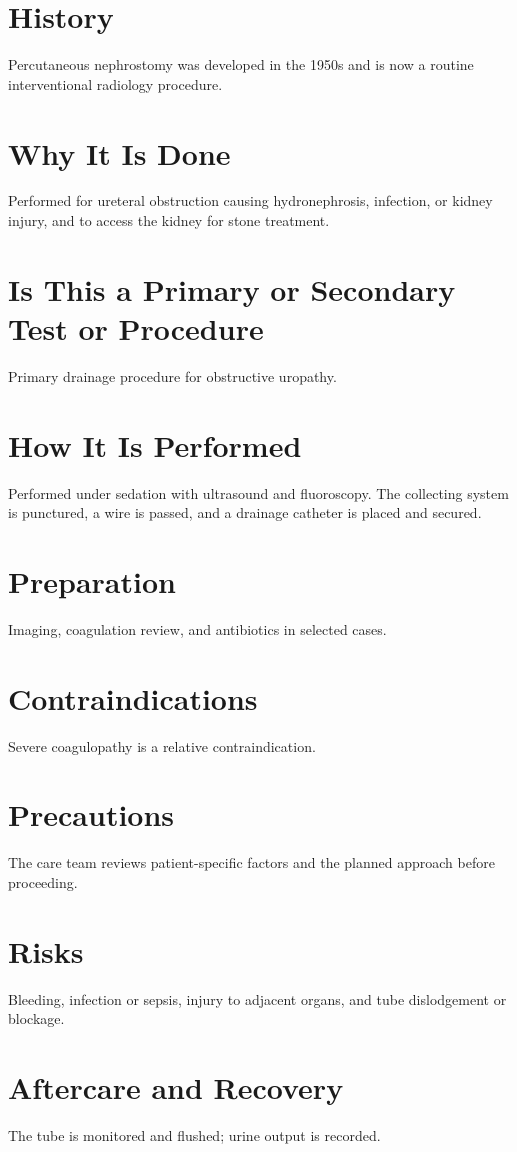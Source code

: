 \section*{History}
Percutaneous nephrostomy was developed in the 1950s and is now a routine interventional radiology procedure.

\section*{Why It Is Done}
Performed for ureteral obstruction causing hydronephrosis, infection, or kidney injury, and to access the kidney for stone treatment.

\section*{Is This a Primary or Secondary Test or Procedure}
Primary drainage procedure for obstructive uropathy.

\section*{How It Is Performed}
Performed under sedation with ultrasound and fluoroscopy. The collecting system is punctured, a wire is passed, and a drainage catheter is placed and secured.

\section*{Preparation}
Imaging, coagulation review, and antibiotics in selected cases.

\section*{Contraindications}
Severe coagulopathy is a relative contraindication.

\section*{Precautions}
The care team reviews patient-specific factors and the planned approach before proceeding.

\section*{Risks}
Bleeding, infection or sepsis, injury to adjacent organs, and tube dislodgement or blockage.

\section*{Aftercare and Recovery}
The tube is monitored and flushed; urine output is recorded.

